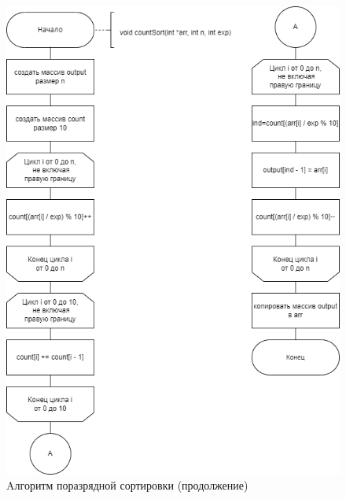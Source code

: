\begin{figure}[h]
	\begin{center}
		\includegraphics[scale=0.7]{img/radix_sort_2.png}
	\end{center}
	\captionsetup{justification=centering}
	\caption{Aлгоритм поразрядной сортировки (продолжение)}
	\label{img:radix_sort_2}
\end{figure}
\clearpage
